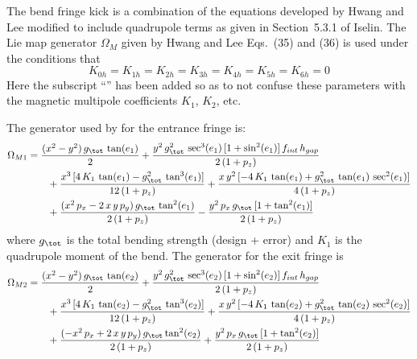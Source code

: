 The bend fringe kick is a combination of the equations developed by Hwang and Lee\cite{b:hwang}
modified to include quadrupole terms as given in Section~5.3.1 of Iselin\cite{b:madphysics}.  The
Lie map generator $\Omega_M$ given by Hwang and Lee Eqs.~(35) and (36) is used under the conditions
that
\begin{equation}
  K_{0h} = K_{1h} = K_{2h} = K_{3h} = K_{4h} = K_{5h} = K_{6h} = 0
\end{equation}
Here the subscript ``'' has been added so as to not confuse these parameters with the magnetic multipole
coefficients $K_1$, $K_2$, etc.

The generator used by \bmad for the entrance fringe is:
\begin{align}
  \Omega_{M1} &= \frac{(x^2 - y^2) \, g_\tot \, \tan (e_1)}{2} 
  + \frac{y^2 \, g_\tot^2 \, \sec^3 (e_1) \, [1 + \sin^2 (e_1)] \, f_{int} \,  h_{gap}}{2 \, (1 + p_z)} \CRNO
  & \qquad + \frac{x^3 \, [4 \, K_1 \, \tan (e_1) - g_\tot^2 \, \tan^3 (e_1)]}{12 \, (1 + p_z)}
  + \frac{x \, y^2 \, [-4 \, K_1 \, \tan (e_1) + g_\tot^2 \, \tan (e_1) \, \sec^2 (e_1)]}{4 \, (1 + p_z)} \\
  &\qquad + \frac{(x^2 \, p_x - 2 \, x \, y \, p_y) \, g_\tot \, \tan^2 (e_1)}{2 \, (1 + p_z)}
  - \frac{y^2 \, p_x \, g_\tot \, [1 + \tan^2 (e_1)]}{2 \, (1 + p_z)} \nonumber
\end{align}
where $g_\tot$ is the total bending strength (design + error) and $K_1$ is the quadrupole moment of the bend.
The generator for the exit fringe is
\begin{align}
  \Omega_{M2} &= \frac{(x^2 - y^2) \, g_\tot \, \tan (e_2)}{2} 
  + \frac{y^2 \, g_\tot^2 \, \sec^3 (e_2) \, [1 + \sin^2 (e_2)] \, f_{int} \,  h_{gap}}{2 \, (1 + p_z)} \CRNO
  &\qquad + \frac{x^3 \, [4 \, K_1 \, \tan (e_2) - g_\tot^2 \, \tan^3 (e_2)]}{12 \, (1 + p_z)}
  + \frac{x \, y^2 \, [-4 \, K_1 \, \tan (e_2) + g_\tot^2 \, \tan (e_2) \, \sec^2 (e_2)]}{4 \, (1+p_z)} \\
  &\qquad + \frac{(-x^2 \, p_x + 2 \, x \, y \, p_y) \, g_\tot \tan^2 (e_2)}{2 \, (1 + p_z)}
  + \frac{y^2 \, p_x \, g_\tot \, [1 + \tan^2 (e_2)]}{2 \, (1 + p_z)} \nonumber
\end{align}


